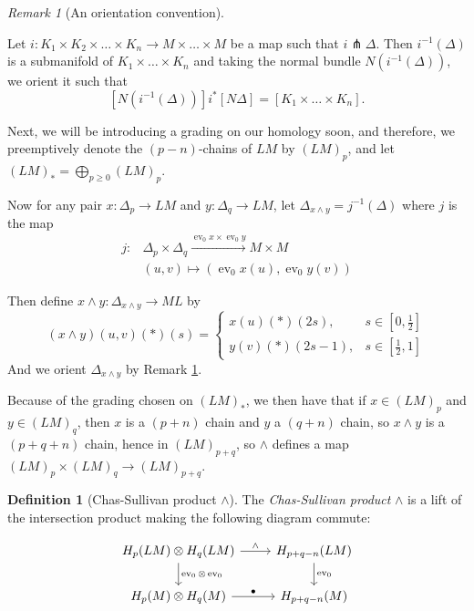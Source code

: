 \documentclass[reqno]{amsart}
\theoremstyle{definition}
\newtheorem{definition}[theorem]{Definition}
\theoremstyle{remark}
\newtheorem*{remark}{Remark}
\DeclareMathOperator{\ev}{ev}
\begin{document}
\begin{remark}[An orientation convention]\cite[Remark 2.1]{Chas-Sullivan}
    \label{Remark:Orientation-Convention}

    Let $i \colon K_1 \times K_2 \times \ldots \times K_n 
    \to M \times \ldots \times M$ be a map such that
    $i \pitchfork \Delta$.
    Then $i^{-1}(\Delta)$ is a submanifold of $K_1 \times \ldots \times 
    K_n$ and taking the normal bundle $N(i^{-1}(\Delta))$, we
    orient it such that
    \[
    \left[ N \left( i^{-1}(\Delta) \right)  \right] 
    i^{*} \left[ N \Delta \right] = 
    \left[ K_1 \times \ldots \times K_n \right].
    \] 
\end{remark}


Next, we will be introducing a grading on our homology soon,
and therefore, we preemptively denote the
$(p-n)$-chains of $LM$ by $(LM)_{p}$, and let
$(LM)_{*} = \bigoplus_{p\ge 0} (LM)_{p}$.

Now for any pair $x\colon \Delta_{p} \to LM$ and
$y \colon \Delta_q \to LM$, let
$\Delta_{x \wedge y} = 
j^{-1}\left( \Delta \right) $ where
$j$ is the map
\begin{align*}
    j \colon &\Delta_p \times \Delta_q \stackrel{\ev_0 x \times \ev_0 y}{\to} 
    M \times M\\
             &(u,v) \mapsto \left( \ev_0 x(u), \ev_0 y(v) \right) 
\end{align*}

Then define $x \wedge y \colon \Delta_{x \wedge y} \to ML$ by
\[
    (x \wedge y) (u,v) (*)(s) = 
    \begin{cases}
        x(u)(*)(2s),& s \in \left[ 0,\frac{1}{2} \right] \\
        y(v)(*)(2s-1),& s \in \left[ \frac{1}{2},1 \right] 
    \end{cases}
\] 
And we orient $\Delta_{x \wedge y}$ by
Remark \ref{Remark:Orientation-Convention}.



Because of the grading chosen on $\left( LM \right)_{*}$, we
then have that if $x \in (LM)_{p}$ and
$y \in (LM)_q$, then
$x$ is a $(p+n)$ chain and $y$ a $(q+n)$ chain, so
$x \wedge y$ is a $(p+q+n)$ chain, hence
in $(LM)_{p+q}$, so 
$\wedge$ defines a map
$\left( LM \right)_p \times (LM)_q \to (LM)_{p+q}$.



\begin{definition}[Chas-Sullivan product $\wedge$]
    The \textit{Chas-Sullivan product} $\wedge$ is a lift
    of the intersection product making the following diagram commute:

    \begin{equation*}
    \begin{tikzcd}
        H_p(LM) \otimes H_q(LM) \ar[d, "\ev_0 \otimes \ev_0"] 
        \ar[r, "\wedge"] & H_{p+q-n}(LM) \ar[d, "\ev_0"] \\
        H_p(M) \otimes H_q(M) \ar[r, "\bullet"] &
        H_{p+q-n}(M)
    \end{tikzcd}
    \end{equation*}
\end{definition}
\end{document}
